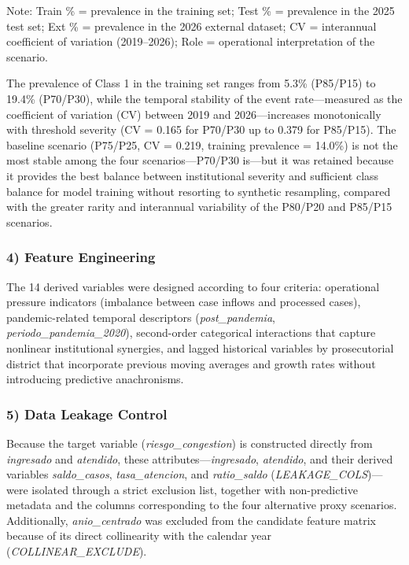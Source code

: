 \documentclass[
  number]{elsarticle}
\begin{document}
Note: Train \% = prevalence in the training set; Test \% = prevalence in
the 2025 test set; Ext \% = prevalence in the 2026 external dataset; CV
= interannual coefficient of variation (2019--2026); Role = operational
interpretation of the scenario.

The prevalence of Class 1 in the training set ranges from 5.3\%
(P85/P15) to 19.4\% (P70/P30), while the temporal stability of the event
rate---measured as the coefficient of variation (CV) between 2019 and
2026---increases monotonically with threshold severity (CV = 0.165 for
P70/P30 up to 0.379 for P85/P15). The baseline scenario (P75/P25, CV =
0.219, training prevalence = 14.0\%) is not the most stable among the
four scenarios---P70/P30 is---but it was retained because it provides
the best balance between institutional severity and sufficient class
balance for model training without resorting to synthetic resampling,
compared with the greater rarity and interannual variability of the
P80/P20 and P85/P15 scenarios.

\subsubsection{4) Feature Engineering}\label{feature-engineering}

The 14 derived variables were designed according to four criteria:
operational pressure indicators (imbalance between case inflows and
processed cases), pandemic-related temporal descriptors
(\emph{post\_pandemia}, \emph{periodo\_pandemia\_2020}), second-order
categorical interactions that capture nonlinear institutional synergies,
and lagged historical variables by prosecutorial district that
incorporate previous moving averages and growth rates without
introducing predictive anachronisms.

\subsubsection{5) Data Leakage Control}\label{data-leakage-control}

Because the target variable (\emph{riesgo\_congestion}) is constructed
directly from \emph{ingresado} and \emph{atendido}, these
attributes---\emph{ingresado}, \emph{atendido}, and their derived
variables \emph{saldo\_casos}, \emph{tasa\_atencion}, and
\emph{ratio\_saldo} (\emph{LEAKAGE\_COLS})---were isolated through a
strict exclusion list, together with non-predictive metadata and the
columns corresponding to the four alternative proxy scenarios.
Additionally, \emph{anio\_centrado} was excluded from the candidate
feature matrix because of its direct collinearity with the calendar year
(\emph{COLLINEAR\_EXCLUDE}).
\end{document}
